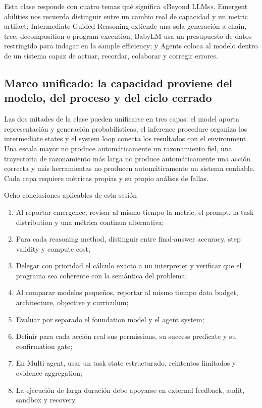 \documentclass[a4paper]{article}
\begin{document}
Esta clase responde con cuatro temas qué significa «Beyond LLMs». Emergent abilities nos recuerda distinguir entre un cambio real de capacidad y un metric artifact; Intermediate-Guided Reasoning extiende una sola generación a chain, tree, decomposition o program execution; BabyLM usa un presupuesto de datos restringido para indagar en la sample efficiency; y Agents coloca al modelo dentro de un sistema capaz de actuar, recordar, colaborar y corregir errores.

\subsection{Marco unificado: la capacidad proviene del modelo, del proceso y del ciclo cerrado}

Las dos mitades de la clase pueden unificarse en tres capas: el model aporta representación y generación probabilísticas, el inference procedure organiza los intermediate states y el system loop conecta los resultados con el environment. Una escala mayor no produce automáticamente un razonamiento fiel, una trayectoria de razonamiento más larga no produce automáticamente una acción correcta y más herramientas no producen automáticamente un sistema confiable. Cada capa requiere métricas propias y su propio análisis de fallas.

\begin{importantbox}{Ocho conclusiones aplicables de esta sesión}
\begin{enumerate}
  \item Al reportar emergence, revisar al mismo tiempo la metric, el prompt, la task distribution y una métrica continua alternativa;
  \item Para cada reasoning method, distinguir entre final-answer accuracy, step validity y compute cost;
  \item Delegar con prioridad el cálculo exacto a un interpreter y verificar que el programa sea coherente con la semántica del problema;
  \item Al comparar modelos pequeños, reportar al mismo tiempo data budget, architecture, objective y curriculum;
  \item Evaluar por separado el foundation model y el agent system;
  \item Definir para cada acción real sus permissions, su success predicate y su confirmation gate;
  \item En Multi-agent, usar un task state estructurado, reintentos limitados y evidence aggregation;
  \item La ejecución de larga duración debe apoyarse en external feedback, audit, sandbox y recovery.
\end{enumerate}
\end{importantbox}
\end{document}
